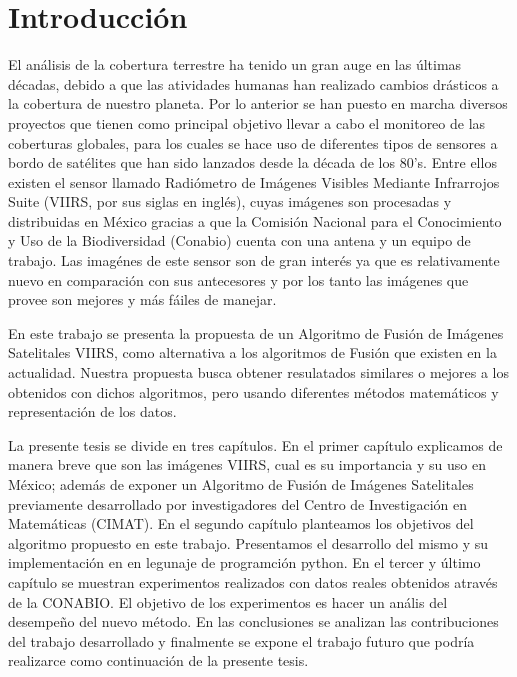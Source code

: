 \chapter{Introducción}

El análisis de la cobertura terrestre ha tenido un gran auge en las últimas décadas, debido a que las atividades humanas han realizado cambios drásticos a la cobertura de nuestro planeta. Por lo anterior se han puesto en marcha diversos proyectos que tienen como principal objetivo llevar a cabo el monitoreo de las coberturas globales, para los cuales se hace uso de diferentes tipos de sensores a bordo de satélites que han sido lanzados desde la década de los 80's. Entre ellos existen el sensor llamado Radiómetro de Imágenes Visibles Mediante Infrarrojos Suite (VIIRS, por sus siglas en inglés), cuyas imágenes son procesadas y distribuidas en México gracias a que la Comisión Nacional para el Conocimiento y Uso de la Biodiversidad (Conabio) cuenta con una antena y un equipo de trabajo. Las imagénes de este sensor son de gran interés ya que es relativamente nuevo en comparación con sus antecesores y por los tanto las imágenes que provee son mejores y más fáiles de manejar. 

En este trabajo se presenta la propuesta de un Algoritmo de Fusión de Imágenes Satelitales VIIRS, como alternativa a los algoritmos de Fusión que existen en la actualidad. Nuestra propuesta busca obtener resulatados similares o mejores a los obtenidos con dichos algoritmos, pero usando diferentes métodos matemáticos y representación de los datos.

La presente tesis se divide en tres capítulos. En el primer capítulo explicamos de manera breve que son las imágenes VIIRS, cual es su importancia y su uso en México; además de exponer un Algoritmo de Fusión de Imágenes Satelitales previamente desarrollado por investigadores del Centro de Investigación en Matemáticas (CIMAT). En el segundo capítulo planteamos los objetivos del algoritmo propuesto en este trabajo. Presentamos el desarrollo del mismo y su implementación en en legunaje de programción python. En el tercer y último capítulo se muestran experimentos realizados con datos reales obtenidos através de la CONABIO. El objetivo de los experimentos es hacer un anális del desempeño del nuevo método. En las conclusiones se analizan las contribuciones del trabajo desarrollado y finalmente se expone el trabajo futuro que podría realizarce como continuación de la presente tesis.